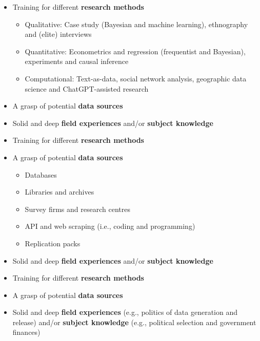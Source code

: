 \documentclass[
  10pt,
  ignorenonframetext,
]{beamer}
\begin{document}
\begin{frame}
\begin{itemize}
  \item Training for different \textbf{research methods}
  \vspace{0.1cm}
  \begin{itemize}
    \item Qualitative: Case study (Bayesian and machine learning), ethnography and (elite) interviews
    \item Quantitative: Econometrics and regression (frequentist and Bayesian), experiments and causal inference
    \item Computational: Text-as-data, social network analysis, geographic data science and ChatGPT-assisted research
  \end{itemize}
  \vspace{0.6cm}
  \item A grasp of potential \textbf{data sources}
  \vspace{0.6cm}
  \item Solid and deep \textbf{field experiences} and/or \textbf{subject knowledge}
\end{itemize}
\end{frame}

\begin{frame}
\begin{itemize}
  \item Training for different \textbf{research methods}
  \vspace{0.6cm}
  \item A grasp of potential \textbf{data sources}
  \vspace{0.1cm}
  \begin{itemize}
    \item Databases
    \item Libraries and archives
    \item Survey firms and research centres
    \item API and web scraping (i.e., coding and programming)
    \item Replication packs
  \end{itemize}
  \vspace{0.6cm}
  \item Solid and deep \textbf{field experiences} and/or \textbf{subject knowledge}
\end{itemize}
\end{frame}

\begin{frame}
\begin{itemize}
  \item Training for different \textbf{research methods}
  \vspace{1cm}
  \item A grasp of potential \textbf{data sources}
  \vspace{1cm}
  \item Solid and deep \textbf{field experiences} (e.g., politics of data generation and release) and/or \textbf{subject knowledge} (e.g., political selection and government finances)
\end{itemize}
\end{frame}
\end{document}

